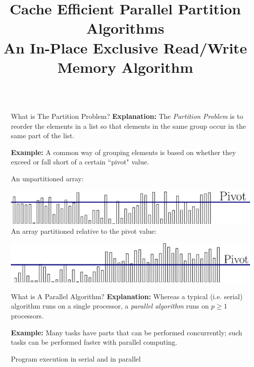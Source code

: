 \documentclass[table,serif,mathserif,final]{beamer}
\title{Cache Efficient Parallel Partition Algorithms \\An In-Place Exclusive Read/Write Memory Algorithm}
\theoremstyle{remark}
\begin{document}
\begin{frame}{}
\begin{columns}[t]
  \begin{column}{0.02\linewidth}
  \end{column}
  \begin{column}{0.43\linewidth}
      
\begin{block}{\Huge What is The Partition Problem?}
  \justifying
  \Huge
  \textbf{Explanation:} The \emph{Partition Problem} is to reorder the elements in a list so that elements in the same group occur in the same part of the list.

  \textbf{Example:} A common way of grouping elements is based on whether they exceed or fall short of a certain ``pivot" value.

  {\color{blue} An unpartitioned array:}

  \includegraphics[width=\linewidth]{imgs/partitionDefn/partitionDefn1Ann.eps}
  {\color{blue} An array partitioned relative to the pivot value:}

  \includegraphics[width=\linewidth]{imgs/partitionDefn/partitionDefn2Ann.eps}
\end{block}
\begin{block}{\Huge What is A Parallel Algorithm?}
  \justifying
  \Huge
  \textbf{Explanation:} Whereas a typical (i.e. serial) algorithm runs on a single processor, a \emph{parallel algorithm} runs on $p \geq 1$ processors.

  \textbf{Example:} Many tasks have parts that can be performed concurrently; such tasks can be performed faster with parallel computing.

  {\color{blue} Program execution in serial and in parallel }


\end{block}
\end{column}
\end{columns}
\end{frame}
\end{document}
